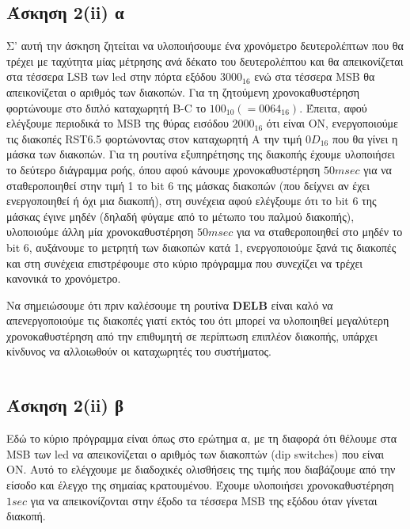 \documentclass[a4paper,10pt]{article} \usepackage{anysize}
\begin{document}
\subsection*{Άσκηση 2(ii) α}
Σ' αυτή την άσκηση ζητείται να υλοποιήσουμε ένα χρονόμετρο δευτερολέπτων
που θα τρέχει με ταχύτητα μίας μέτρησης ανά δέκατο του δευτερολέπτου και θα
απεικονίζεται στα τέσσερα LSB των led στην πόρτα εξόδου $3000_{16}$ ενώ στα τέσσερα
MSB θα απεικονίζεται ο αριθμός των διακοπών. Για τη ζητούμενη χρονοκαθυστέρηση
φορτώνουμε στο διπλό  καταχωρητή B-C το $100_{10} (=0064_{16})$. Έπειτα, αφού
ελέγξουμε περιοδικά το MSB της θύρας εισόδου $2000_{16}$  ότι είναι ΟΝ,
ενεργοποιούμε τις διακοπές RST6.5 φορτώνοντας στον καταχωρητή Α την τιμή
$0D_{16}$
που θα γίνει η μάσκα των διακοπών. Για τη ρουτίνα εξυπηρέτησης της διακοπής
έχουμε υλοποιήσει το δεύτερο διάγραμμα ροής, όπου αφού κάνουμε
χρονοκαθυστέρηση $50 msec$ για να σταθεροποιηθεί στην τιμή 1 το bit 6 της μάσκας
διακοπών (που δείχνει αν έχει ενεργοποιηθεί ή όχι μια διακοπή), στη συνέχεια
αφού ελέγξουμε ότι το bit 6 της μάσκας έγινε μηδέν (δηλαδή φύγαμε από το
μέτωπο του παλμού διακοπής), υλοποιούμε άλλη μία χρονοκαθυστέρηση $50 msec$ για
να σταθεροποιηθεί στο μηδέν το bit 6, αυξάνουμε το μετρητή των διακοπών κατά
1, ενεργοποιούμε ξανά τις διακοπές και στη συνέχεια επιστρέφουμε στο κύριο
πρόγραμμα που συνεχίζει να τρέχει κανονικά το χρονόμετρο.

Να σημειώσουμε ότι πριν καλέσουμε τη ρουτίνα \textbf{DELB} είναι καλό να
απενεργοποιούμε τις διακοπές γιατί εκτός του ότι μπορεί να υλοποιηθεί
μεγαλύτερη χρονοκαθυστέρηση από την επιθυμητή σε περίπτωση επιπλέον διακοπής,
υπάρχει κίνδυνος να αλλοιωθούν οι καταχωρητές του συστήματος.
\inputminted[linenos,obeytabs,fontsize=\footnotesize]{oldasm}{../askhsh_2_ii_a.8085}
\subsection*{Άσκηση 2(ii) β}
Εδώ το κύριο πρόγραμμα είναι όπως στο ερώτημα α, με τη διαφορά ότι θέλουμε στα
MSB των led να απεικονίζεται ο αριθμός των διακοπτών (dip switches) που είναι
ON. Αυτό το ελέγχουμε με διαδοχικές ολισθήσεις της τιμής που διαβάζουμε από
την είσοδο και έλεγχο της σημαίας κρατουμένου. Έχουμε υλοποιήσει
χρονοκαθυστέρηση $1sec$ για να απεικονίζονται στην έξοδο τα τέσσερα MSB της
εξόδου όταν γίνεται διακοπή. 
\inputminted[linenos,obeytabs,fontsize=\footnotesize]{oldasm}{../askhsh_2_ii_b.8085}
\end{document}

